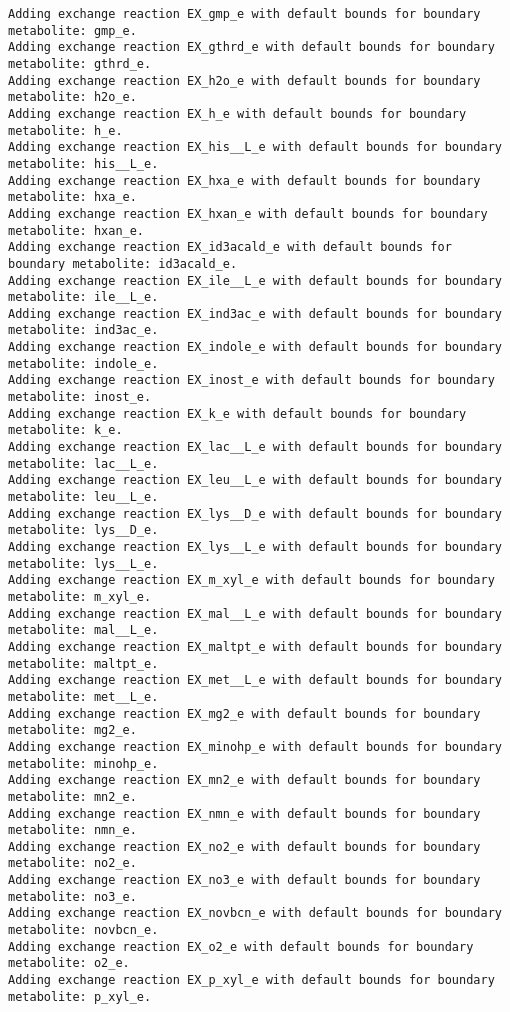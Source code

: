 \documentclass[
  letterpaper,
  DIV=11,
  numbers=noendperiod]{scrartcl}
\begin{document}
\begin{verbatim}
Adding exchange reaction EX_gmp_e with default bounds for boundary metabolite: gmp_e.
Adding exchange reaction EX_gthrd_e with default bounds for boundary metabolite: gthrd_e.
Adding exchange reaction EX_h2o_e with default bounds for boundary metabolite: h2o_e.
Adding exchange reaction EX_h_e with default bounds for boundary metabolite: h_e.
Adding exchange reaction EX_his__L_e with default bounds for boundary metabolite: his__L_e.
Adding exchange reaction EX_hxa_e with default bounds for boundary metabolite: hxa_e.
Adding exchange reaction EX_hxan_e with default bounds for boundary metabolite: hxan_e.
Adding exchange reaction EX_id3acald_e with default bounds for boundary metabolite: id3acald_e.
Adding exchange reaction EX_ile__L_e with default bounds for boundary metabolite: ile__L_e.
Adding exchange reaction EX_ind3ac_e with default bounds for boundary metabolite: ind3ac_e.
Adding exchange reaction EX_indole_e with default bounds for boundary metabolite: indole_e.
Adding exchange reaction EX_inost_e with default bounds for boundary metabolite: inost_e.
Adding exchange reaction EX_k_e with default bounds for boundary metabolite: k_e.
Adding exchange reaction EX_lac__L_e with default bounds for boundary metabolite: lac__L_e.
Adding exchange reaction EX_leu__L_e with default bounds for boundary metabolite: leu__L_e.
Adding exchange reaction EX_lys__D_e with default bounds for boundary metabolite: lys__D_e.
Adding exchange reaction EX_lys__L_e with default bounds for boundary metabolite: lys__L_e.
Adding exchange reaction EX_m_xyl_e with default bounds for boundary metabolite: m_xyl_e.
Adding exchange reaction EX_mal__L_e with default bounds for boundary metabolite: mal__L_e.
Adding exchange reaction EX_maltpt_e with default bounds for boundary metabolite: maltpt_e.
Adding exchange reaction EX_met__L_e with default bounds for boundary metabolite: met__L_e.
Adding exchange reaction EX_mg2_e with default bounds for boundary metabolite: mg2_e.
Adding exchange reaction EX_minohp_e with default bounds for boundary metabolite: minohp_e.
Adding exchange reaction EX_mn2_e with default bounds for boundary metabolite: mn2_e.
Adding exchange reaction EX_nmn_e with default bounds for boundary metabolite: nmn_e.
Adding exchange reaction EX_no2_e with default bounds for boundary metabolite: no2_e.
Adding exchange reaction EX_no3_e with default bounds for boundary metabolite: no3_e.
Adding exchange reaction EX_novbcn_e with default bounds for boundary metabolite: novbcn_e.
Adding exchange reaction EX_o2_e with default bounds for boundary metabolite: o2_e.
Adding exchange reaction EX_p_xyl_e with default bounds for boundary metabolite: p_xyl_e.

\end{verbatim}
\end{document}
